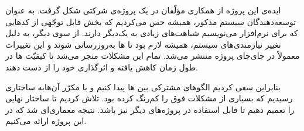 ایده‌ی این پروژه از همکاری مؤلّفان در یک پروژه‌ی شرکتی شکل گرفت. به عنوان توسعه‌دهندگان سیستم مذکور، همیشه حس می‌کردیم که بخش قابل توجّهی از کدهایی که برای  نرم‌افزار می‌نویسیم شباهت‌های زیادی به یک‌دیگر دارند.
از سوی دیگر، به دلیل تغییر نیازمندی‌های سیستم، همیشه لازم بود تا ها به‌روزرسانی شوند و این تغییرات معمولاً در جای‌جای پروژه منتشر می‌شد. تمام این مشکلات منجر می‌شد تا کیفیّت ها در طول زمان کاهش یافته و اثرگذاری خود را از دست دهند.

بنابراین سعی کردیم الگوهای مشترکی بین ها پیدا کنیم و با  مکرّر آن‌هابه ساختاری رسیدیم که بسیاری از مشکلات فوق را کم‌رنگ کرده بود. تلاش کردیم تا ساختار نهایی را تعمیم دهیم تا قابل استفاده در پروژه‌های دیگر نیز باشد. نتیجه معماری‌ای شد که در این پروژه ارائه می‌کنیم.

